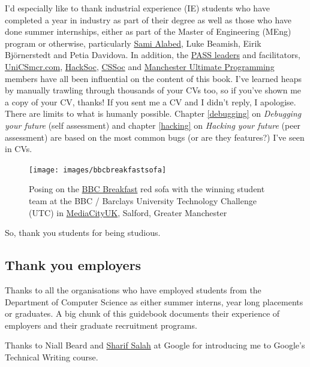 \documentclass[
]{book}
\begin{document}
I'd especially like to thank industrial experience (IE) students who have completed a year in industry as part of their degree as well as those who have done summer internships, either as part of the Master of Engineering (MEng) program or otherwise, particularly \href{https://github.com/samialabed}{Sami Alabed}, Luke Beamish, Eirik Björnerstedt and Petia Davidova. In addition, the \href{http://www.pass.manchester.ac.uk}{PASS leaders} and facilitators, \href{https://unicsmcr.com/}{UniCSmcr.com}, \href{https://github.com/unicsmcr/hacksoc.com}{HackSoc}, \href{https://github.com/cssoc}{CSSoc} and \href{https://github.com/Man-UP}{Manchester Ultimate Programming} members have all been influential on the content of this book. I've learned heaps by manually trawling through thousands of your CVs too, so if you've shown me a copy of your CV, thanks! If you sent me a CV and I didn't reply, I apologise. There are limits to what is humanly possible. Chapter \ref{debugging} on \emph{Debugging your future} (self assessment) and chapter \ref{hacking} on \emph{Hacking your future} (peer assessment) are based on the most common bugs (or are they features?) I've seen in CVs.

\begin{figure}

{\centering \texttt{[image: images/bbcbreakfastsofa]} 

}

\caption{Posing on the \href{https://en.wikipedia.org/wiki/BBC_Breakfast}{BBC Breakfast} red sofa with the winning student team at the BBC / Barclays University Technology Challenge (UTC) in \href{https://en.wikipedia.org/wiki/MediaCityUK}{MediaCityUK}, Salford, Greater Manchester}\label{fig:unnamed-chunk-3}
\end{figure}



So, thank you students for being studious. 🙏

\hypertarget{employers}{%
\subsection{Thank you employers}\label{employers}}

Thanks to all the organisations who have employed students from the Department of Computer Science as either summer interns, year long placements or graduates. A big chunk of this guidebook documents their experience of employers and their graduate recruitment programs.

Thanks to Niall Beard and \href{https://github.com/sharifsalah}{Sharif Salah} at Google for introducing me to Google's Technical Writing course. \citep{googling}
\end{document}
